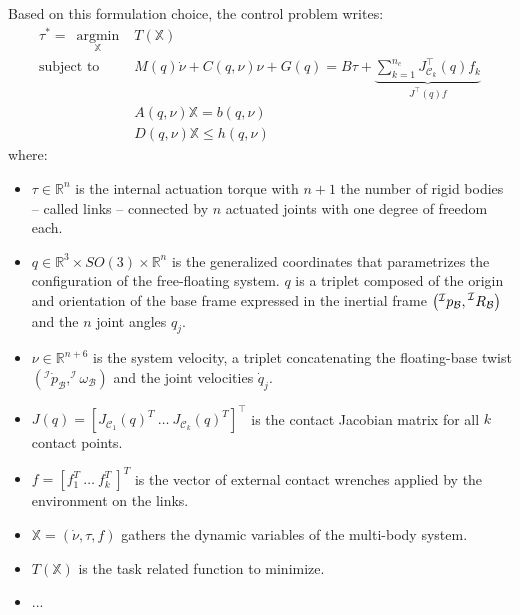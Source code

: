 \documentclass[12pt,a4paper,twoside]{article}
\newcommand{\vect}[1]{\mbox{\boldmath${#1}$}}%
\DeclareMathOperator*{\argmin}{argmin}
\begin{document}
Based on this formulation choice, the control problem writes:
\begin{subequations}\label{eq:one task}
\begin{eqnarray}
{\tau}^* =~\argmin \limits_{\mathbb{X}} & T(\mathbb{X}) \label{eq:cp obj}\\  
\text{subject to} 
  & {M}(q) {\dot{\nu}}+{C}({q},{\nu}){\nu} + G(q) = {B} {\tau} + \underbrace{\sum_{k = 1}^{n_c} {J}^\top_{\mathcal{C}_k}(q) f_k}_{J^\top(q) f} \label{eq:cp dyn model}\\ 
  & {A}(q,\nu) \mathbb{X}   =  {b}(q,\nu)  \label{eq:cp eq cons} \\
  & {D}(q,\nu) \mathbb{X} \leq {h}(q,\nu)  \label{eq:cp ineq cons}
\end{eqnarray}               
\end{subequations}
where:
\begin{itemize}
\item $\tau \in \mathbb{R}^n$ is the internal actuation torque with $n + 1$ the number of rigid bodies -- called links -- connected by $n$ actuated joints with one degree of freedom each.
\item ${q} \in \mathbb{R}^3 \times SO(3)\times \mathbb{R}^n$ is the generalized coordinates that parametrizes the configuration of the free-floating system. $q$ is a triplet composed of the origin and orientation of the base frame expressed in the inertial frame $\left(\prescript{\mathcal{I}}{}p_{\mathcal{B}},\prescript{\mathcal{I}}{}R_{\mathcal{B}}\right)$ and the $n$ joint angles $q_j$.
\item ${\nu} \in \mathbb{R}^{n+6}$ is the system velocity, a triplet concatenating the floating-base twist $\left (^\mathcal{I}\dot{ p}_{\mathcal{B}},^\mathcal{I}\omega_{\mathcal{B}}\right)$ and the joint velocities ${\dot{q}}_j$.
\item ${J}({q})= \left[{J}_{\mathcal{C}_1}({q})^{T}~ \dots~ {J}_{\mathcal{C}_k}({q})^{T} \right]^\top$ is the contact Jacobian matrix for all $k$ contact points.
\item $f= \left[ {f}_{1}^T~ \dots~ {f}_{k}^T~ \right]^T$ is the vector of external contact wrenches applied by the environment on the links.
\item $\mathbb{X} = \left(\dot{\nu}, \tau, f \right)$ gathers the dynamic variables of the multi-body system.
\item $T(\mathbb{X})$ is the task related function to minimize.
\item ...
\end{itemize}
\end{document}
